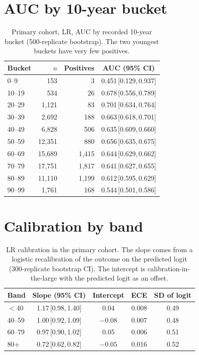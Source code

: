 \documentclass{article}
\newcommand{\ci}[2]{\,\mbox{[#1,\,#2]}}
\begin{document}
\section{AUC by 10-year bucket}
\begin{table}[H]
\centering\small
\caption{Primary cohort, LR, AUC by recorded 10-year bucket (500-replicate bootstrap). The two youngest buckets have very few positives.}
\label{tab:decades}
\begin{tabular}{@{}lrrc@{}}
\toprule
Bucket & $n$ & Positives & AUC (95\% CI) \\
\midrule
0--9 & 153 & 3 & 0.451\ci{0.129}{0.937} \\
10--19 & 534 & 26 & 0.678\ci{0.556}{0.789} \\
20--29 & 1,121 & 83 & 0.701\ci{0.634}{0.764} \\
30--39 & 2,692 & 188 & 0.663\ci{0.618}{0.701} \\
40--49 & 6,828 & 506 & 0.635\ci{0.609}{0.660} \\
50--59 & 12,351 & 880 & 0.656\ci{0.635}{0.675} \\
60--69 & 15,689 & 1,415 & 0.644\ci{0.629}{0.662} \\
70--79 & 17,751 & 1,817 & 0.641\ci{0.627}{0.655} \\
80--89 & 11,110 & 1,199 & 0.612\ci{0.595}{0.629} \\
90--99 & 1,761 & 168 & 0.544\ci{0.501}{0.586} \\
\bottomrule
\end{tabular}
\end{table}

\section{Calibration by band}
\begin{table}[H]
\centering\small
\caption{LR calibration in the primary cohort. The slope comes from a logistic recalibration of the outcome on the predicted logit (300-replicate bootstrap CI). The intercept is calibration-in-the-large with the predicted logit as an offset.}
\begin{tabular}{@{}lcccc@{}}
\toprule
Band & Slope (95\% CI) & Intercept & ECE & SD of logit \\
\midrule
$<$40 & 1.17\ci{0.98}{1.40} & 0.04 & 0.008 & 0.49 \\
40--59 & 1.00\ci{0.92}{1.09} & $-0.08$ & 0.007 & 0.48 \\
60--79 & 0.97\ci{0.90}{1.02} & 0.05 & 0.006 & 0.51 \\
80+ & 0.72\ci{0.62}{0.82} & $-0.05$ & 0.016 & 0.52 \\
\bottomrule
\end{tabular}
\end{table}
\end{document}
